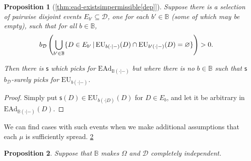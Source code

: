 \documentclass[a4paper]{article}
\newtheorem{theorem}{Theorem}
\newtheorem{proposition}[theorem]{Proposition}
\renewcommand\P{\mathbb{P}} %
\newcommand\EU{\mathrm{EU}}
\newcommand\EAd{\mathrm{EAd}}
\newcommand{\Decs}{\mathcal{D}}
\newcommand\s{\mathsf{s}}
\newcommand{\IB}{\mathbb{B}}
\newcommand{\IP}{\P}
\renewcommand{\color}[1]{}
\newenvironment{colored}[1]{\leavevmode\color{#1}}{}
\newcommand\SetDelimiter[1][]{
	\nonscript\,#1\vert \allowbreak \nonscript\,\mathopen{}}
\providecommand\given{\SetDelimiter}
\renewcommand{\emptyset}{\varnothing}
\newenvironment{CCM rewritten}
{\begingroup\color{blue}} %
{\endgroup}              %
\begin{document}
\begin{colored}{violet}
\begin{proposition}[\cref{thm:ead-existsimpermissible[dep]}]
Suppose there is a selection of pairwise disjoint events $E_{b'}\subseteq\Decs$, one for each $b'\in\IB$ (some of which may be empty),  such that for all $b\in\IB$, $$b_\Decs\left(\bigcup_{b'\in\IB}\{D\in E_{b'}\given \EU_{b(\cdot|-)}(D)\cap \EU_{b'(\cdot|-)}(D)=\emptyset\}\right)>0.$$

Then there is $\s$ which picks for $\EAd_{\IB(\cdot|-)}$ but where there is no $b\in\IB$ such that $\s$  $b_\Decs$-surely picks for $\EU_{b(\cdot|-)}$. 
\end{proposition}
\begin{proof}
	Simply put $\s(D)\in\EU_{b(\cdot|D)}(D)$ for $D\in E_b$, and let it be arbitrary in $\EAd_{\IB(\cdot|-)}(D)$. 
\end{proof}

%

%		
%	
%

We can find cases with such events when we make additional assumptions that each $\mu$ is sufficiently spread. \cref{thm:ead-existsimpermissible[dep]:spreadegtakeorleave}



\begin{proposition}\label{thm:ead-existsimpermissible[dep]:spreadegtakeorleave}
	Suppose that $\IB$ makes $\Omega$ and $\Decs$ completely independent. 
	

\end{proposition}
\end{colored}
\end{document}
